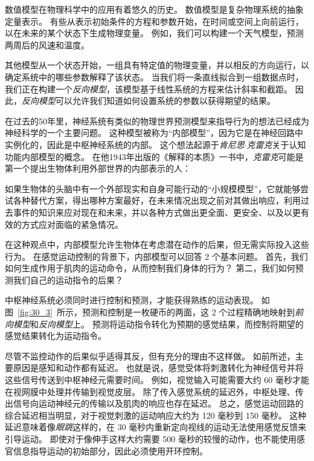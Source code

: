 \begin{proposition}[内部模型] \label{box:30_1}
	
	\quad \quad 数值模型在物理科学中的应用有着悠久的历史。
	数值模型是复杂物理系统的抽象定量表示。
	有些从表示初始条件的方程和参数开始，在时间或空间上向前运行，以在未来的某个状态下生成物理变量。
	例如，我们可以构建一个天气模型，预测两周后的风速和温度。
	
	\quad \quad 其他模型从一个状态开始，一组具有特定值的物理变量，并以相反的方向运行，以确定系统中的哪些参数解释了该状态。
	当我们将一条直线拟合到一组数据点时，我们正在构建一个\textit{反向模型}，该模型基于线性系统的方程来估计斜率和截距。
	因此，\textit{反向模型}可以允许我们知道如何设置系统的参数以获得期望的结果。
	
	\quad \quad 在过去的50年里，神经系统有类似的物理世界预测模型来指导行为的想法已经成为神经科学的一个主要问题。
	这种模型被称为“内部模型”，因为它是在神经回路中实例化的，因此是中枢神经系统的内部。
	这个想法起源于\textit{肯尼思$\cdot$克雷克}关于认知功能内部模型的概念。
	在他1943年出版的《解释的本质》一书中，\textit{克雷克}可能是第一个提出生物体利用外部世界的内部表示的人：
	
	\quad \quad 如果生物体的头脑中有一个外部现实和自身可能行动的“小规模模型”，它就能够尝试各种替代方案，得出哪种方案最好，在未来情况出现之前对其做出响应，利用过去事件的知识来应对现在和未来，并以各种方式做出更全面、更安全、以及以更有效的方式应对面临的紧急情况。
	
	\quad \quad 在这种观点中，内部模型允许生物体在考虑潜在动作的后果，但无需实际投入这些行为。
	在感觉运动控制的背景下，内部模型可以回答 2 个基本问题。
	首先，我们如何生成作用于肌肉的运动命令，从而控制我们身体的行为？
	第二，我们如何预测我们自己的运动指令的后果？
	
	\quad \quad 中枢神经系统必须同时进行控制和预测，才能获得熟练的运动表现。
	如图~\ref{fig:30_3}~所示，预测和控制是一枚硬币的两面，这 2 个过程精确地映射到\textit{前向模型}和\textit{反向模型}上。
	预测将运动指令转化为预期的感觉结果，而控制将期望的感觉结果转化为运动指令。
	
\end{proposition}


尽管不监控动作的后果似乎适得其反，但有充分的理由不这样做。
如前所述，主要原因是感知和动作都有延迟。
也就是说，感觉受体将刺激转化为神经信号并将这些信号传送到中枢神经元需要时间。
例如，视觉输入可能需要大约 60 毫秒才能在视网膜中处理并传输到视觉皮层。
除了传入感觉系统的延迟外，中枢处理、传出信号向运动神经元的传输以及肌肉的响应也存在延迟。
总之，感觉运动回路的综合延迟相当明显，对于视觉刺激的运动响应大约为 120 毫秒到 150 毫秒。
这种延迟意味着像\textit{眼跳}这样的，在 30 毫秒内重新定向视线的运动无法使用感觉反馈来引导运动。
即使对于像伸手这样大约需要 500 毫秒的较慢的动作，也不能使用感官信息指导运动的初始部分，因此必须使用开环控制。



